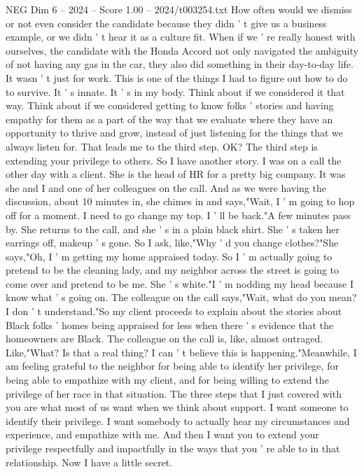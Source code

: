 \begin{textsample}{NEG Dim 6 – 2024 – Score 1.00 – 2024/t003254.txt}
How often would we dismiss or not even consider the candidate because they didn ' t give us a business example, or we didn ' t hear it as a culture fit.
When if we ' re really honest with ourselves, the candidate with the Honda Accord not only navigated the ambiguity of not having any gas in the car, they also did something in their day-to-day life.
It wasn ' t just for work.
This is one of the things I had to figure out how to do to survive.
It ' s innate.
It ' s in my body.
Think about if we considered it that way.
Think about if we considered getting to know folks ' stories and having empathy for them as a part of the way that we evaluate where they have an opportunity to thrive and grow, instead of just listening for the things that we always listen for.
That leads me to the third step.
OK?
The third step is extending your privilege to others.
So I have another story.
I was on a call the other day with a client.
She is the head of HR for a pretty big company.
It was she and I and one of her colleagues on the call.
And as we were having the discussion, about 10 minutes in, she chimes in and says,"Wait, I ' m going to hop off for a moment.
I need to go change my top.
I ' ll be back."A few minutes pass by.
She returns to the call, and she ' s in a plain black shirt.
She ' s taken her earrings off, makeup ' s gone.
So I ask, like,"Why ' d you change clothes?"She says,"Oh, I ' m getting my home appraised today.
So I ' m actually going to pretend to be the cleaning lady, and my neighbor across the street is going to come over and pretend to be me.
She ' s white."I ' m nodding my head because I know what ' s going on.
The colleague on the call says,"Wait, what do you mean?
I don ' t understand."So my client proceeds to explain about the stories about Black folks ' homes being appraised for less when there ' s evidence that the homeowners are Black.
The colleague on the call is, like, almost outraged.
Like,"What?
Is that a real thing?
I can ' t believe this is happening."Meanwhile, I am feeling grateful to the neighbor for being able to identify her privilege, for being able to empathize with my client, and for being willing to extend the privilege of her race in that situation.
The three steps that I just covered with you are what most of us want when we think about support.
I want someone to identify their privilege.
I want somebody to actually hear my circumstances and experience, and empathize with me.
And then I want you to extend your privilege respectfully and impactfully in the ways that you ' re able to in that relationship.
Now I have a little secret.

\end{textsample}
